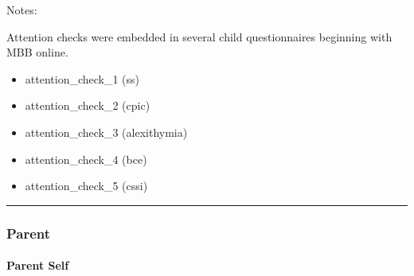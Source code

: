 \documentclass[]{book}
\providecommand{\tightlist}{%
  \setlength{\itemsep}{0pt}\setlength{\parskip}{0pt}}
\let\oldparagraph\paragraph
\renewcommand{\paragraph}[1]{\oldparagraph{#1}\mbox{}}
\begin{document}
Notes:

Attention checks were embedded in several child questionnaires beginning with MBB online.

\begin{itemize}
\tightlist
\item
  attention\_check\_1 (ss)
\item
  attention\_check\_2 (cpic)
\item
  attention\_check\_3 (alexithymia)
\item
  attention\_check\_4 (bce)
\item
  attention\_check\_5 (cssi)
\end{itemize}

\begin{center}\rule{0.5\linewidth}{0.5pt}\end{center}

\hypertarget{parent}{%
\subsubsection{Parent}\label{parent}}

\hypertarget{parent-self}{%
\paragraph{Parent Self}\label{parent-self}}
\end{document}
